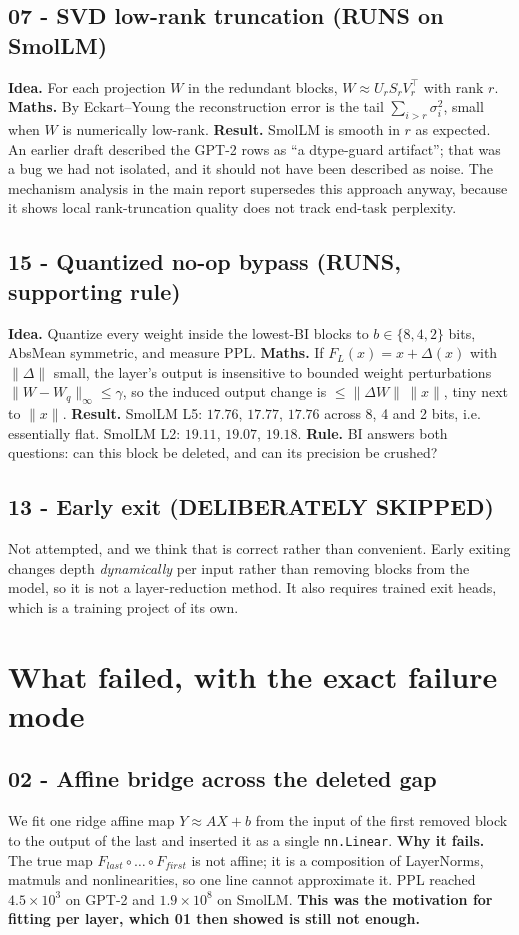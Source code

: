 \documentclass[11pt]{article}
\begin{document}
\subsection{07 - SVD low-rank truncation (RUNS on SmolLM)}
\textbf{Idea.} For each projection $W$ in the redundant blocks,
$W\approx U_r S_r V_r^\top$ with rank $r$.
\textbf{Maths.} By Eckart--Young the reconstruction error is the tail
$\sum_{i>r}\sigma_i^2$, small when $W$ is numerically low-rank.
\textbf{Result.} SmolLM is smooth in $r$ as expected. An earlier draft
described the GPT-2 rows as ``a dtype-guard artifact''; that was a bug we had
not isolated, and it should not have been described as noise. The mechanism
analysis in the main report supersedes this approach anyway, because it shows
local rank-truncation quality does not track end-task perplexity.

\subsection{15 - Quantized no-op bypass (RUNS, supporting rule)}
\textbf{Idea.} Quantize every weight inside the lowest-BI blocks to
$b\in\{8,4,2\}$ bits, AbsMean symmetric, and measure PPL.
\textbf{Maths.} If $F_L(x)=x+\Delta(x)$ with $\|\Delta\|$ small, the layer's
output is insensitive to bounded weight perturbations
$\|W-W_q\|_\infty\le\gamma$, so the induced output change is
$\le\|\Delta W\|\,\|x\|$, tiny next to $\|x\|$.
\textbf{Result.} SmolLM L5: $17.76$, $17.77$, $17.76$ across 8, 4 and 2
bits, i.e. essentially flat. SmolLM L2: $19.11$, $19.07$, $19.18$.
\textbf{Rule.} BI answers both questions: can this block be deleted, and can
its precision be crushed?

\subsection{13 - Early exit (DELIBERATELY SKIPPED)}
Not attempted, and we think that is correct rather than convenient. Early
exiting changes depth \emph{dynamically} per input rather than removing
blocks from the model, so it is not a layer-reduction method. It also
requires trained exit heads, which is a training project of its own.

\section{What failed, with the exact failure mode}

\subsection{02 - Affine bridge across the deleted gap}
We fit one ridge affine map $Y\approx AX+b$ from the input of the first
removed block to the output of the last and inserted it as a single
\texttt{nn.Linear}. \textbf{Why it fails.} The true map
$F_{last}\circ\dots\circ F_{first}$ is not affine; it is a composition of
LayerNorms, matmuls and nonlinearities, so one line cannot approximate it.
PPL reached $4.5\times10^3$ on GPT-2 and $1.9\times10^8$ on SmolLM.
\textbf{This was the motivation for fitting per layer, which 01 then showed
is still not enough.}
\end{document}
